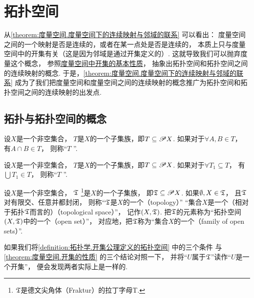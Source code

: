 \section{拓扑空间}
从\cref{theorem:度量空间.度量空间下的连续映射与邻域的联系} 可以看出：
度量空间之间的一个映射是否是连续的，或者在某一点处是否是连续的，
本质上只与度量空间中的开集有关（这是因为邻域是通过开集定义的）.
这就导致我们可以抛弃度量这个概念，
参照\hyperref[theorem:度量空间.开集的性质]{度量空间中开集的基本性质}，
抽象出拓扑空间和拓扑空间之间的连续映射的概念.
于是，\cref{theorem:度量空间.度量空间下的连续映射与邻域的联系}
成为了我们把度量空间和度量空间之间的连续映射的概念推广为拓扑空间和拓扑空间之间的连续映射的出发点.

\subsection{拓扑与拓扑空间的概念}
\begin{definition}
设\(X\)是一个非空集合，
\(T\)是\(X\)的一个子集族，即\(T \subseteq \mathscr{P} X\).
如果对于\(\forall A,B \in T\)，
有\(A \cap B \in T\)，
则称“\(T\) ”.
\end{definition}

\begin{definition}
设\(X\)是一个非空集合，
\(T\)是\(X\)的一个子集族，即\(T \subseteq \mathscr{P} X\).
如果对于\(\forall T_1 \subseteq T\)，
有\(\bigcup T_1 \in T\)，
则称“\(T\) ”.
\end{definition}

\begin{definition}\label{definition:拓扑学.开集公理定义的拓扑空间}
设\(X\)是一个非空集合，
\({\mathfrak T}\) \footnote{
	\({\mathfrak T}\)是德文尖角体（Fraktur）的拉丁字母T.
}是\(X\)的一个子集族，
即\({\mathfrak T} \subseteq \mathscr{P} X\).
如果\(\emptyset,X \in {\mathfrak T}\)，
且\({\mathfrak T}\)对有限交、任意并都封闭，
则称“\({\mathfrak T}\)是\(X\)的一个（topology）”
“集合\(X\)是一个（相对于拓扑\({\mathfrak T}\)而言的）（topological space）”，
记作\((X,{\mathfrak T})\).
把\({\mathfrak T}\)的元素称为“拓扑空间\((X,{\mathfrak T})\)中的一个（open set）”，
对应地，把\({\mathfrak T}\)称为“集合\(X\)的一个（family of open sets）”.
\end{definition}
如果我们将\cref{definition:拓扑学.开集公理定义的拓扑空间} 中的三个条件
与\cref{theorem:度量空间.开集的性质} 的三个结论对照一下，
并将“\(U\)属于\({\mathfrak T}\)”读作“\(U\)是一个开集”，
便会发现两者实际上是一样的.

